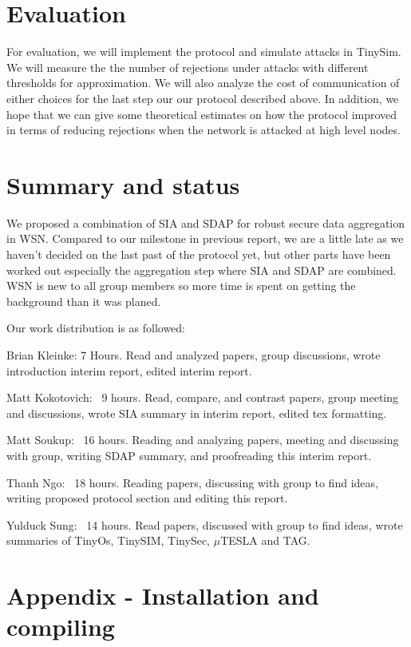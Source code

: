 \documentclass[a4paper]{article}
\begin{document}
\section{Evaluation}
\label{sec:evaluation}

For evaluation, we will implement the protocol and simulate attacks in
TinySim. We will measure the the number of rejections under attacks with
different thresholds for approximation. We will also analyze the cost of
communication of either choices for the last step our our protocol described
above. In addition, we hope that we can give some theoretical estimates on how
the protocol improved in terms of reducing rejections when the network is
attacked at high level nodes.

\section{Summary and status}
\label{sec:summary}

We proposed a combination of SIA and SDAP for robust secure data aggregation
in WSN. Compared to our milestone in previous report, we are a little late as
we haven't decided on the last past of the protocol yet, but other parts have
been worked out especially the aggregation step where SIA and SDAP are
combined. WSN is new to all group members so more time is spent on getting the
background than it was planed.

Our work distribution is as followed:

Brian Kleinke: 7 Hours. Read and analyzed papers, group discussions, wrote
introduction interim report, edited interim report.

Matt Kokotovich: ~9 hours. Read, compare, and contrast papers, group meeting
and discussions, wrote SIA summary in interim report, edited tex formatting.

Matt Soukup: ~16 hours. Reading and analyzing papers, meeting and discussing
with group, writing SDAP summary, and proofreading this interim report.

Thanh Ngo: ~18 hours. Reading papers, discussing with group to find ideas,
writing proposed protocol section and editing this report.

Yulduck Sung: ~14 hours. Read papers, discussed with group to find ideas,
wrote summaries of TinyOs, TinySIM, TinySec, $\mu$TESLA and TAG.

\section{Appendix - Installation and compiling}
\label{sec:appendix}
\end{document}
